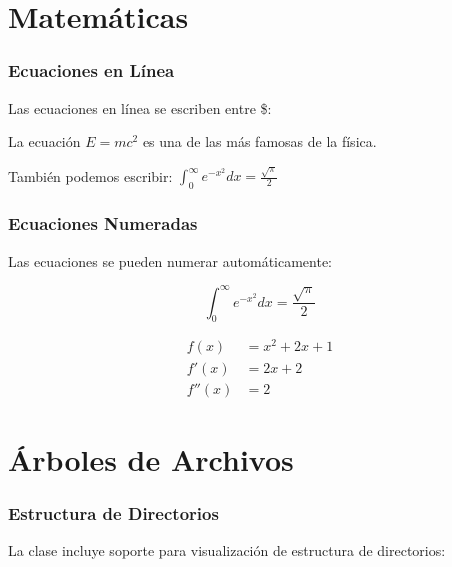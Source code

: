 \documentclass{pt-slides}
\begin{document}
\section{Matemáticas}

\begin{frame}
    \frametitle{Ecuaciones en Línea}

    Las ecuaciones en línea se escriben entre \$:

    \vspace{0.5cm}

    La ecuación $E = mc^2$ es una de las más famosas de la física.

    \vspace{0.5cm}

    También podemos escribir: $\int_{0}^{\infty} e^{-x^2} dx = \frac{\sqrt{\pi}}{2}$
\end{frame}

\begin{frame}
    \frametitle{Ecuaciones Numeradas}

    Las ecuaciones se pueden numerar automáticamente:

    \begin{equation}
        \int_{0}^{\infty} e^{-x^2} dx = \frac{\sqrt{\pi}}{2}
    \end{equation}

    \vspace{0.3cm}

    \begin{align}
        f(x)   & = x^2 + 2x + 1 \\
        f'(x)  & = 2x + 2       \\
        f''(x) & = 2
    \end{align}
\end{frame}

\section{Árboles de Archivos}

\begin{frame}[fragile]
    \frametitle{Estructura de Directorios}

    La clase incluye soporte para visualización de estructura de directorios:

    \vspace{0.3cm}

    \begin{ptdirtree}
    \end{ptdirtree}
\end{frame}
\end{document}
